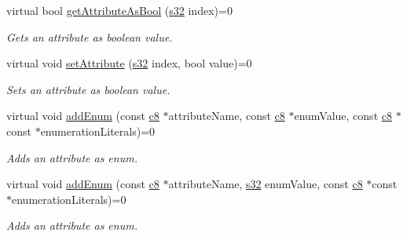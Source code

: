 \begin{DoxyCompactItemize}
virtual bool \hyperlink{classirr_1_1io_1_1IAttributes_acf9dc477c8610923c373d2ad15ff7752}{get\+Attribute\+As\+Bool} (\hyperlink{namespaceirr_ac66849b7a6ed16e30ebede579f9b47c6}{s32} index)=0
\begin{DoxyCompactList}\small\item\em Gets an attribute as boolean value. \end{DoxyCompactList}\item 
\mbox{\label{classirr_1_1io_1_1IAttributes_a02fde3a6de462bd36b9338e2f3b35a92}} 
virtual void \hyperlink{classirr_1_1io_1_1IAttributes_a02fde3a6de462bd36b9338e2f3b35a92}{set\+Attribute} (\hyperlink{namespaceirr_ac66849b7a6ed16e30ebede579f9b47c6}{s32} index, bool value)=0
\begin{DoxyCompactList}\small\item\em Sets an attribute as boolean value. \end{DoxyCompactList}\item 
\mbox{\label{classirr_1_1io_1_1IAttributes_af03f3c31e9dadc98d875f993a8995819}} 
virtual void \hyperlink{classirr_1_1io_1_1IAttributes_af03f3c31e9dadc98d875f993a8995819}{add\+Enum} (const \hyperlink{namespaceirr_a9395eaea339bcb546b319e9c96bf7410}{c8} $\ast$attribute\+Name, const \hyperlink{namespaceirr_a9395eaea339bcb546b319e9c96bf7410}{c8} $\ast$enum\+Value, const \hyperlink{namespaceirr_a9395eaea339bcb546b319e9c96bf7410}{c8} $\ast$const $\ast$enumeration\+Literals)=0
\begin{DoxyCompactList}\small\item\em Adds an attribute as enum. \end{DoxyCompactList}\item 
\mbox{\label{classirr_1_1io_1_1IAttributes_a00fad990466737cced8be90079444fe4}} 
virtual void \hyperlink{classirr_1_1io_1_1IAttributes_a00fad990466737cced8be90079444fe4}{add\+Enum} (const \hyperlink{namespaceirr_a9395eaea339bcb546b319e9c96bf7410}{c8} $\ast$attribute\+Name, \hyperlink{namespaceirr_ac66849b7a6ed16e30ebede579f9b47c6}{s32} enum\+Value, const \hyperlink{namespaceirr_a9395eaea339bcb546b319e9c96bf7410}{c8} $\ast$const $\ast$enumeration\+Literals)=0
\begin{DoxyCompactList}\small\item\em Adds an attribute as enum. \end{DoxyCompactList}\item 

\end{DoxyCompactItemize}
